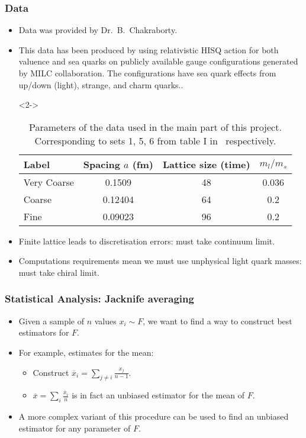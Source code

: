 \documentclass{beamer}
\begin{document}
\begin{frame}
\frametitle{Data}
\begin{itemize}
    \item<1-> Data was provided by Dr.\ B.\ Chakraborty.
    \item<1-> This data has been produced by using relativistic HISQ action for both valuence and sea quarks on publicly available gauge configurations generated by MILC collaboration. The configurations have sea quark effects from up/down (light), strange, and charm quarks.\cite{chakraborty2021improved}.
    \item[]<2-> 
        \begin{table}
            \centering
            \begin{tabular}{l S[table-format=1.5] S[table-format=2.0] S[table-format=1.3]}
Label       & {Spacing $a$ (\si{fm})}   & {Lattice size (time)} & {$m_l / m_s$}\\
\midrule 
Very Coarse & 0.1509                    & 48                    & 0.036\\
Coarse      & 0.12404                   & 64                    & 0.2\\
Fine        & 0.09023                   & 96                    & 0.2\\
            \end{tabular}
            \caption{Parameters of the data used in the main part of this project. Corresponding to sets 1, 5, 6 from table I in~\cite{chakraborty2021improved} respectively.}
        \end{table}
    \item<3-> Finite lattice leads to discretisation errors: must take continuum limit.
    \item<4-> Computations requirements mean we must use unphysical light quark masses: must take chiral limit.
\end{itemize}
\end{frame}

\begin{frame}
\frametitle{Statistical Analysis: Jacknife averaging}
\begin{itemize}
    \item<1-> Given a sample of $n$ values $x_i \sim F$, we want to find a way to construct best estimators for $F$.
    \item<2-> For example, estimates for the mean:
        \begin{itemize}
            \item Construct $\overline{x}_i = \sum_{j\neq i} \frac{x_j}{n-1}$.
            \item $\overline{x} = \sum_i\frac{\overline{x}_i}{n}$ is in fact an unbiased estimator for the mean of $F$.
        \end{itemize}
    \item<3-> A more complex variant of this procedure can be used to find an unbiased estimator for any parameter of $F$\cite{efron1982jackknife}.
\end{itemize}
\end{frame}
\end{document}
